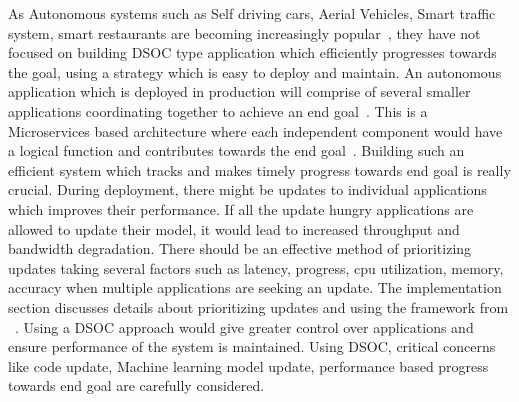 As Autonomous systems such as Self driving cars, Aerial Vehicles, Smart traffic system, smart restaurants are becoming increasingly popular~\cite{swarm_docker}, they have not focused on building DSOC type application which efficiently progresses towards the goal, using a strategy which is easy to deploy and maintain. An autonomous application which is deployed in production will comprise of several smaller applications coordinating together to achieve an end goal~\cite{IOT_growth}. This is a Microservices based architecture where each independent component would have a logical function and contributes towards the end goal~\cite{micro_article}. Building such an efficient system which tracks and makes timely progress towards end goal is really crucial. During deployment, there might be updates to individual applications which improves their performance. If all the update hungry applications are allowed to update their model, it would lead to increased throughput and bandwidth degradation. There should be an effective method of prioritizing updates taking several factors such as latency, progress, cpu utilization, memory, accuracy when multiple applications are seeking an update. The implementation section discusses details about prioritizing updates and using the framework from ~\cite{SoftwarePilot}. Using a DSOC approach would give greater control over applications and ensure performance of the system is maintained. Using DSOC, critical concerns like code update, Machine learning model update, performance based progress towards end goal are carefully considered.



